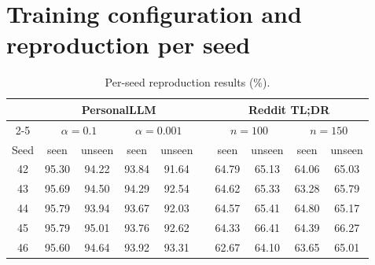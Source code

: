 \documentclass[11pt,a4paper]{article}
\begin{document}
\clearpage
\appendix
\section{Training configuration and reproduction per seed}
\label{app:details}

\begin{table}[ht]
\centering\small
\caption{Training configuration (shared by all experiments unless noted).}
\end{table}

\begin{table}[ht]
\centering\small
\caption{Per-seed reproduction results (\%).}
\begin{tabular}{@{}c cc cc c cc cc@{}}
\toprule
& \multicolumn{4}{c}{PersonalLLM} && \multicolumn{4}{c}{Reddit TL;DR}\\
\cmidrule{2-5}\cmidrule{7-10}
& \multicolumn{2}{c}{$\alpha=0.1$} & \multicolumn{2}{c}{$\alpha=0.001$} && \multicolumn{2}{c}{$n=100$} & \multicolumn{2}{c}{$n=150$}\\
Seed & seen & unseen & seen & unseen && seen & unseen & seen & unseen\\
\midrule
42 & 95.30 & 94.22 & 93.84 & 91.64 && 64.79 & 65.13 & 64.06 & 65.03\\
43 & 95.69 & 94.50 & 94.29 & 92.54 && 64.62 & 65.33 & 63.28 & 65.79\\
44 & 95.79 & 93.94 & 93.67 & 92.03 && 64.57 & 65.41 & 64.80 & 65.17\\
45 & 95.79 & 95.01 & 93.76 & 92.62 && 64.33 & 66.41 & 64.39 & 66.27\\
46 & 95.60 & 94.64 & 93.92 & 93.31 && 62.67 & 64.10 & 63.65 & 65.01\\
\bottomrule
\end{tabular}
\end{table}
\end{document}
